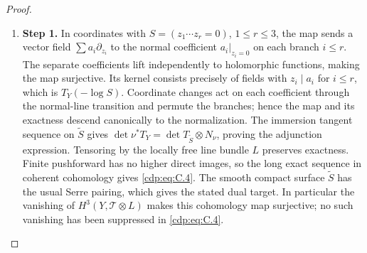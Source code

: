 \begin{proof}
\begin{enumerate}[label={$\langle1\rangle$\arabic*.},leftmargin=*]
\item 
\noindent\textbf{Step 1.} In coordinates with $S=(z_1\cdots z_r=0)$, $1\le r\le3$, the map sends a vector field $\sum a_i\partial_{z_i}$ to the normal coefficient $a_i|_{z_i=0}$ on each branch $i\le r$. The separate coefficients lift independently to holomorphic functions, making the map surjective. Its kernel consists precisely of fields with $z_i\mid a_i$ for $i\le r$, which is $T_Y(-\log S)$. Coordinate changes act on each coefficient through the normal-line transition and permute the branches; hence the map and its exactness descend canonically to the normalization. The immersion tangent sequence on $\widetilde S$ gives $\det\nu^*T_Y=\det T_{\widetilde S}\otimes N_\nu$, proving the adjunction expression. Tensoring by the locally free line bundle $L$ preserves exactness. Finite pushforward has no higher direct images, so the long exact sequence in coherent cohomology gives \eqref{cdp:eq:C.4}. The smooth compact surface $\widetilde S$ has the usual Serre pairing, which gives the stated dual target. In particular the vanishing of $H^3(Y,\mathcal T\otimes L)$ makes this cohomology map surjective; no such vanishing has been suppressed in \eqref{cdp:eq:C.4}.

\end{enumerate}
\end{proof}
